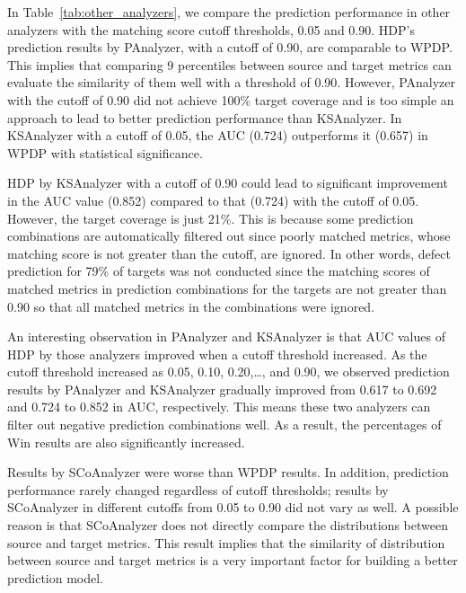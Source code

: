 In Table~\ref{tab:other_analyzers}, we compare the prediction performance in
other analyzers with the matching score cutoff thresholds, 0.05 and 0.90.
HDP's prediction results by PAnalyzer, with a cutoff of 0.90, are
comparable to WPDP. This
implies that comparing 9 percentiles between source and target metrics can
evaluate the similarity of them well with a threshold of 0.90. However,
PAnalyzer with the cutoff of 0.90 did not achieve 100\% target coverage and is
too simple an approach to lead to better prediction performance than KSAnalyzer. In
KSAnalyzer with a cutoff of 0.05, the AUC (0.724) outperforms it (0.657) in WPDP
with statistical significance.

HDP by KSAnalyzer with a cutoff of 0.90 could lead to significant
improvement in the AUC value (0.852) compared to that (0.724) with the
cutoff of 0.05.
However, the target coverage is just 21\%. This is because some prediction
combinations are automatically filtered out since poorly matched metrics, whose
matching score is not greater than the cutoff, are ignored. In other words,
defect prediction for 79\% of targets was not
conducted since the matching scores of matched metrics in prediction
combinations for the targets are not greater than 0.90 so
that all matched metrics in the combinations were ignored.

An interesting observation in PAnalyzer and KSAnalyzer is that AUC
values of HDP by those analyzers improved when a cutoff threshold
increased. As the cutoff threshold increased as 0.05, 0.10, 0.20,\ldots, and
0.90, we observed prediction results by PAnalyzer and KSAnalyzer
gradually improved from 0.617 to 0.692 and 0.724 to 0.852 in AUC, respectively.
This means these two analyzers can filter out negative prediction combinations
well. As a result, the percentages of Win results are also significantly
increased.

Results by SCoAnalyzer were
worse than WPDP results. In addition,
prediction performance rarely changed regardless of cutoff thresholds; results
by SCoAnalyzer in different cutoffs from 0.05 to 0.90 did not
vary as well.
A possible reason is that SCoAnalyzer does not directly compare
the distributions between source and target metrics.
This result implies that the similarity of distribution between source and
target metrics is a very important factor for building a better
prediction model.


